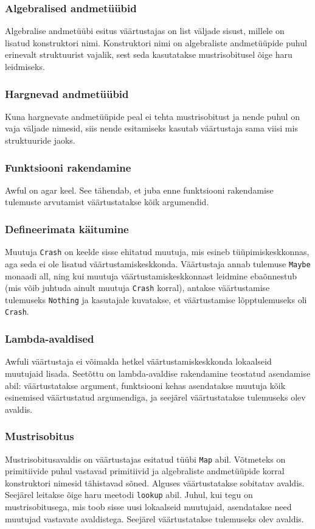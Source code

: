 \documentclass[12pt]{article}
\begin{document}
      \subsubsection{Algebralised andmetüübid}
        Algebralise andmetüübi esitus väärtustajas on list väljade sisust, millele on lisatud konstruktori nimi. Konstruktori nimi on algebraliste andmetüüpide puhul erinevalt struktuurist vajalik, sest seda kasutatakse mustrisobitusel õige haru leidmiseks.
      \subsubsection{Hargnevad andmetüübid}
        Kuna hargnevate andmetüüpide peal ei tehta mustrisobitust ja nende puhul on vaja väljade nimesid, siis nende esitamiseks kasutab väärtustaja sama viisi mis struktuuride jaoks.
      \subsubsection{Funktsiooni rakendamine}
        Awful on agar keel. See tähendab, et juba enne funktsiooni rakendamise tulemuste arvutamist väärtustatakse kõik argumendid.
      \subsubsection{Defineerimata käitumine}
        Muutuja \verb!Crash! on keelde sisse ehitatud muutuja, mis esineb tüüpimiskeskkonnas, aga seda ei ole lisatud väärtustamiskeskkonda. Väärtustaja annab tulemuse \verb!Maybe! monaadi all, ning kui muutuja väärtustamiskeskkonnast leidmine ebaõnnestub (mis võib juhtuda ainult muutuja \verb!Crash! korral), antakse väärtustamise tulemuseks \verb!Nothing! ja kasutajale kuvatakse, et väärtustamise lõpptulemuseks oli \verb!Crash!.
      \subsubsection{Lambda-avaldised}
        Awfuli väärtustaja ei võimalda hetkel väärtustamiskeskkonda lokaalseid muutujaid lisada. Seetõttu on lambda-avaldise rakendamine teostatud asendamise abil: väärtustatakse argument, funktsiooni kehas asendatakse muutuja kõik esinemised väärtustatud argumendiga, ja seejärel väärtustatakse tulemuseks olev avaldis.
      \subsubsection{Mustrisobitus}
        Mustrisobitusavaldis on väärtustajas esitatud tüübi \verb!Map! abil. Võtmeteks on primitiivide puhul vastavad primitiivid ja algebraliste andmetüüpide korral konstruktori nimesid tähistavad sõned. Alguses väärtustatakse sobitatav avaldis. Seejärel leitakse õige haru meetodi \verb!lookup! abil. Juhul, kui tegu on mustrisobitusega, mis toob sisse uusi lokaalseid muutujaid, asendatakse need muutujad vastavate avaldistega. Seejärel väärtustatakse tulemuseks olev avaldis.
\end{document}
